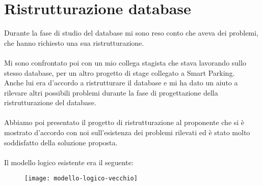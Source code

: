 
\chapter{Ristrutturazione database}
\label{cap:ristrutturazione-database}

Durante la fase di studio del database mi sono reso conto che aveva dei problemi, che hanno
richiesto una sua ristrutturazione.
\\\\
Mi sono confrontato poi con un mio collega stagista che stava lavorando sullo stesso database, per
un altro progetto di stage collegato a Smart Parking.
\\
Anche lui era d'accordo a ristrutturare il database e mi ha dato un aiuto a rilevare altri possibili
problemi durante la fase di progettazione della ristrutturazione del database.
\\\\
Abbiamo poi presentato il progetto di ristrutturazione al proponente che si è mostrato d'accordo con
noi sull'esistenza dei problemi rilevati ed è stato molto soddisfatto della soluzione proposta.
\\\\
Il modello logico esistente era il seguente:
\begin{figure}[!h]
  \centering
  \texttt{[image: modello-logico-vecchio]}
\end{figure}

